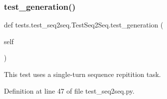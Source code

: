 \mbox{\label{classtests_1_1test__seq2seq_1_1TestSeq2Seq_a203ba54e9671ce31936a202a4e2e6686}} 
\subsubsection{\texorpdfstring{test\+\_\+generation()}{test\_generation()}}
{\footnotesize\ttfamily def tests.\+test\+\_\+seq2seq.\+Test\+Seq2\+Seq.\+test\+\_\+generation (\begin{DoxyParamCaption}\item[{}]{self }\end{DoxyParamCaption})}

\begin{DoxyVerb}This test uses a single-turn sequence repitition task.
\end{DoxyVerb}
 

Definition at line 47 of file test\+\_\+seq2seq.\+py.



